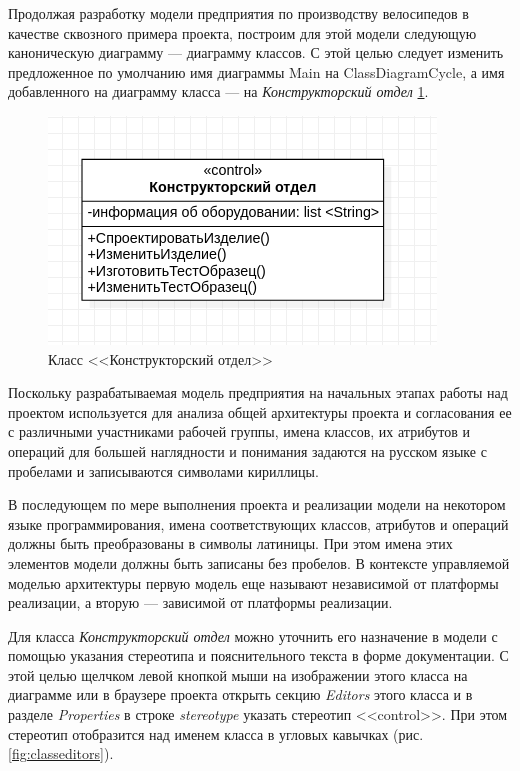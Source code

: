 \documentclass[a4paper,12pt]{extreport}
\begin{document}
Продолжая разработку модели предприятия по производству велосипедов в качестве сквозного примера проекта, построим для этой модели следующую каноническую диаграмму --- диаграмму классов. С этой целью следует изменить предложенное по умолчанию имя диаграммы Main на ClassDiagramCycle, а имя добавленного на диаграмму класса --- на \textit{Конструкторский отдел} \ref{fig:constructclass}.

\begin{figure}[h!]
	\centering
	\includegraphics[width=0.6\linewidth]{images/constructclass}
	\caption{Класс <<Конструкторский отдел>>}
	\label{fig:constructclass}
\end{figure}


Поскольку разрабатываемая модель предприятия на начальных этапах работы над проектом используется для анализа общей архитектуры проекта и согласования ее с различными участниками рабочей группы, имена классов, их атрибутов и операций для большей наглядности и понимания задаются на русском языке с пробелами и записываются символами кириллицы.

В последующем по мере выполнения проекта и реализации модели на некотором языке программирования, имена соответствующих классов, атрибутов и операций должны быть преобразованы в символы латиницы. При этом имена этих элементов модели должны быть записаны без пробелов. В контексте управляемой моделью архитектуры первую модель еще называют независимой от платформы реализации, а вторую --- зависимой от платформы реализации.

Для класса \textit{Конструкторский отдел} можно уточнить его назначение в модели с помощью указания стереотипа и пояснительного текста в форме документации. С этой целью щелчком левой кнопкой мыши на изображении этого класса на диаграмме или в браузере проекта открыть секцию \textit{Editors} этого класса и в разделе \textit{Properties} в строке \textit{stereotype} указать стереотип <<control>>. При этом стереотип отобразится над именем класса в угловых кавычках (рис. \ref{fig:classeditors}).
\end{document}
